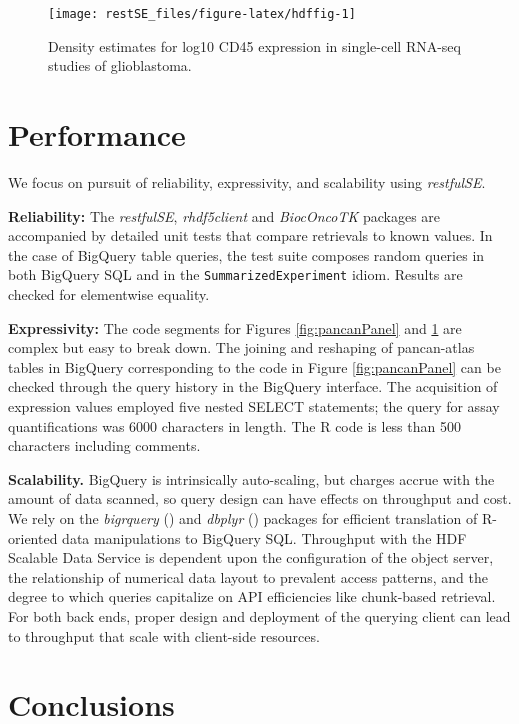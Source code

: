 \documentclass[9pt,a4paper,]{extarticle}
\begin{document}
\begin{figure}[h]

{\centering \texttt{[image: restSE\_files/figure-latex/hdffig-1]} 

}

\caption{Density estimates for log10 CD45 expression in single-cell RNA-seq studies of glioblastoma.}\label{fig:hdffig}
\end{figure}

\section{Performance}\label{performance}

We focus on pursuit of reliability,
expressivity, and scalability using \textit{restfulSE}.

\textbf{Reliability:}
The \textit{restfulSE}, \textit{rhdf5client}
and \textit{BiocOncoTK} packages are accompanied by detailed unit
tests that compare retrievals to known values. In the
case of BigQuery table queries, the test
suite composes random queries
in both BigQuery SQL and in the \texttt{SummarizedExperiment}
idiom. Results
are checked for elementwise equality.

\textbf{Expressivity:} The code
segments for Figures \ref{fig:pancanPanel} and \ref{fig:hdffig} are
complex but easy to break down. The joining and
reshaping of pancan-atlas tables in BigQuery corresponding
to the code in Figure \ref{fig:pancanPanel}
can be checked through the query history in the BigQuery
interface. The acquisition of expression values employed
five nested SELECT statements; the query for assay quantifications
was 6000 characters in length.
The R code is less than 500 characters including comments.

\textbf{Scalability.} BigQuery is intrinsically auto-scaling,
but charges accrue with the amount of data scanned,
so query design can have effects on throughput
and cost. We rely on the \textit{bigrquery} (\citet{bigr})
and \textit{dbplyr} (\citet{dbp}) packages for
efficient translation of R-oriented data manipulations to
BigQuery SQL. Throughput with the HDF Scalable Data Service
is dependent upon the configuration of the object server,
the relationship of numerical data layout to prevalent access
patterns, and the degree to which queries capitalize on
API efficiencies like chunk-based retrieval. For both
back ends, proper design and deployment of the querying client can
lead to throughput that scale with client-side resources.

\section{Conclusions}\label{conclusions}
\end{document}
